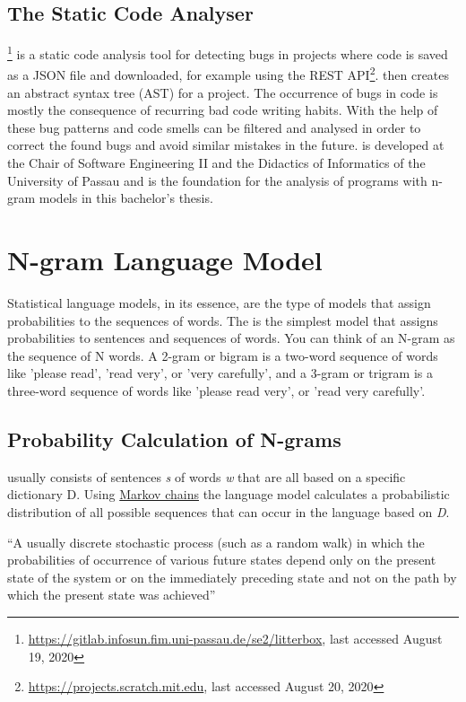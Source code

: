 \subsection{The Static \scratch{} Code Analyser \litterbox{}}\label{subsec:litterbox}
\litterbox{}\footnote{\url{https://gitlab.infosun.fim.uni-passau.de/se2/litterbox}, last accessed August 19, 2020} is a static code analysis tool for detecting bugs in \scratch{} projects where \scratch{} code is saved as a JSON file and downloaded, for example using the \scratch{} REST API\footnote{\url{https://projects.scratch.mit.edu}, last accessed August 20, 2020}. \litterbox{} then creates an abstract syntax tree (AST) for a \scratch{} project. The occurrence of bugs in code is mostly the consequence of recurring bad code writing habits. With the help of \litterbox{} these bug patterns and code smells can be filtered and analysed in order to correct the found bugs and avoid similar mistakes in the future. \litterbox{} is developed at the Chair of Software Engineering II and the Didactics of Informatics of the University of Passau and is the foundation for the analysis of \scratch{} programs with n-gram models in this bachelor's thesis. 


\section{N-gram Language Model}\label{sec:language-models}
Statistical language models, in its essence, are the type of models that assign probabilities to the sequences of words. The \ngram{} is the simplest model that assigns probabilities to sentences and sequences of words. You can think of an N-gram as the sequence of N words. A 2-gram or bigram is a two-word sequence of words like 'please read', 'read very', or 'very carefully', and a 3-gram or trigram is a three-word sequence of words like 'please read very', or 'read very carefully'. 

\subsection{Probability Calculation of N-grams}\label{subsec:ngram}
\ngram{} usually consists of sentences \textit{s} of words \textit{w} that are all based on a specific dictionary {D}. Using \hyperref[def:markov_chain]{Markov chains} the language model calculates a  probabilistic distribution of all possible sequences that can occur in the language based on \textit{D}.

\begin{definition}\label{def:markov_chain}
    ``A usually discrete stochastic process (such as a random walk) in which the probabilities of occurrence of various future states depend only on the present state of the system or on the immediately preceding state and not on the path by which the present state was achieved''~\cite{markov_chain}
\end{definition} 


